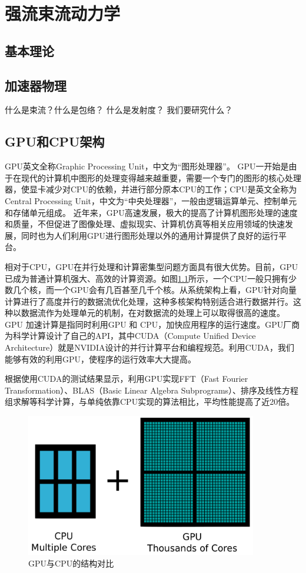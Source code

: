 
\chapter{强流束流动力学}
\label{chap:AccBasic}

\section{基本理论}

\section{加速器物理}
什么是束流？什么是包络？
什么是发射度？
我们要研究什么？
\section{GPU和CPU架构}
GPU英文全称Graphic Processing Unit，中文为“图形处理器”。
GPU一开始是由于在现代的计算机中图形的处理变得越来越重要，需要一个专门的图形的核心处理器，使显卡减少对CPU的依赖，并进行部分原本CPU的工作；CPU是英文全称为Central Processing Unit，中文为“中央处理器”，一般由逻辑运算单元、控制单元和存储单元组成。
近年来，GPU高速发展，极大的提高了计算机图形处理的速度和质量，不但促进了图像处理、虚拟现实、计算机仿真等相关应用领域的快速发展，同时也为人们利用GPU进行图形处理以外的通用计算提供了良好的运行平台。

相对于CPU，GPU在并行处理和计算密集型问题方面具有很大优势。目前，GPU已成为普通计算机强大、高效的计算资源。如图\ref{fig:GPU}所示，一个CPU一般只拥有少数几个核，而一个GPU会有几百甚至几千个核。从系统架构上看，GPU针对向量计算进行了高度并行的数据流优化处理，这种多核架构特别适合进行数据并行。这种以数据流作为处理单元的机制，在对数据流的处理上可以取得很高的速度。
GPU 加速计算是指同时利用GPU 和 CPU，加快应用程序的运行速度\cite{gpu2008}。GPU厂商为科学计算设计了自己的API，其中CUDA（Compute Unified Device Architecture）就是NVIDIA设计的并行计算平台和编程规范\cite{nvidia2010programming}。利用CUDA，我们能够有效的利用GPU，使程序的运行效率大大提高。

根据使用CUDA的测试结果显示，利用GPU实现FFT（Fast Fourier Transformation）、BLAS（Basic Linear Algebra Subprograms）、排序及线性方程组求解等科学计算，与单纯依靠CPU实现的算法相比，平均性能提高了近20倍。
\begin{figure}[!htb]
    \centering
    \includegraphics[width=0.9\textwidth]{plot/GPU_vs_CPU.png}
    \caption{GPU与CPU的结构对比}
    \label{fig:GPU}
\end{figure}

